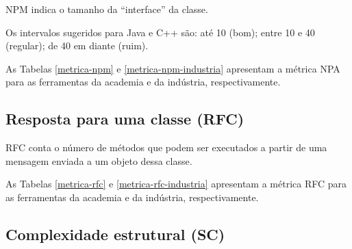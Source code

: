 NPM indica o tamanho da ``interface'' da classe.

Os intervalos sugeridos para Java e C++ são: até 10 (bom); entre 10 e 40
(regular); de 40 em diante (ruim).

As Tabelas \ref{metrica-npm} e \ref{metrica-npm-industria} apresentam a
métrica NPA para as ferramentas da academia e da indústria, respectivamente.



\subsection{Resposta para uma classe (RFC)}

RFC conta o número de métodos que podem ser executados a partir de uma
mensagem enviada a um objeto dessa classe.

As Tabelas \ref{metrica-rfc} e \ref{metrica-rfc-industria} apresentam a
métrica RFC para as ferramentas da academia e da indústria, respectivamente.



\subsection{Complexidade estrutural (SC)}

